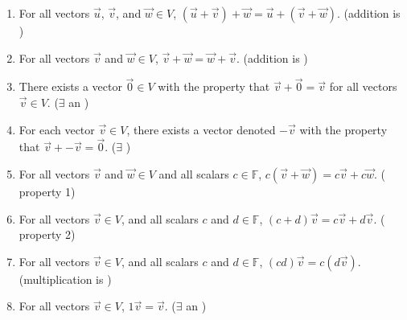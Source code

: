 \documentclass[11pt,fleqn]{book} %
\begin{document}
\begin{enumerate}[label=(\arabic*)]
    \item For all vectors $\overrightarrow{u}$, $\overrightarrow{v}$, and $\overrightarrow{w} \in V$, $(\overrightarrow{u} + \overrightarrow{v}) + \overrightarrow{w} = \overrightarrow{u} + (\overrightarrow{v} + \overrightarrow{w})$. (addition is )

    \item For all vectors $\overrightarrow{v}$ and $\overrightarrow{w} \in V$, $\overrightarrow{v} + \overrightarrow{w} = \overrightarrow{w} + \overrightarrow{v}$. (addition is )

    \item There exists a vector $\overrightarrow{0} \in V$ with the property that $\overrightarrow{v} + \overrightarrow{0} = \overrightarrow{v}$ for all vectors $\overrightarrow{v} \in V$. ($\exists$ an )

    \item For each vector $\overrightarrow{v} \in V$, there exists a vector denoted $-\overrightarrow{v}$ with the property that $\overrightarrow{v} + -\overrightarrow{v} = \overrightarrow{0}$. ($\exists$ )

    \item For all vectors $\overrightarrow{v}$ and $\overrightarrow{w} \in V$  and all scalars $c \in \mathbb{F}$, $c(\overrightarrow{v}+ \overrightarrow{w}) = c\overrightarrow{v} + c\overrightarrow{w}$. ( property 1)

    \item For all vectors $\overrightarrow{v} \in V$, and all scalars $c$ and $d \in \mathbb{F}$, $(c + d)\overrightarrow{v} = c\overrightarrow{v} + d\overrightarrow{v}$. ( property 2)

    \item For all vectors $\overrightarrow{v} \in V$, and all scalars $c$ and $d \in \mathbb{F}$, $(cd)\overrightarrow{v} = c(d\overrightarrow{v})$. (multiplication is )

    \item For all vectors $\overrightarrow{v} \in V$, $1\overrightarrow{v} = \overrightarrow{v}$. ($\exists$ an )
\end{enumerate}
\end{document}
